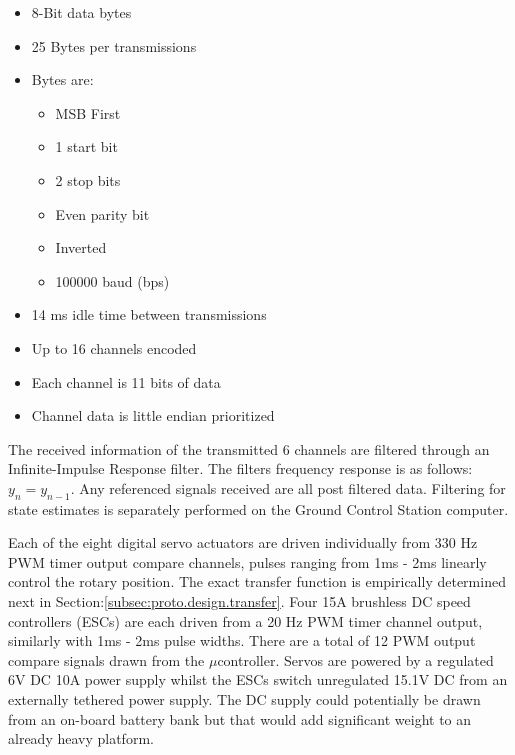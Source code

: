 \begin{itemize}
\item 8-Bit data bytes
\item 25 Bytes per transmissions
\item Bytes are:
\begin{itemize}
\item MSB First
\item 1 start bit
\item 2 stop bits
\item Even parity bit
\item Inverted
\item 100000 baud (bps)
\end{itemize}
\item 14 ms idle time between transmissions
\item Up to 16 channels encoded
\item Each channel is 11 bits of data
\item Channel data is little endian prioritized
\end{itemize}
{\color{red}
The received information of the transmitted 6 channels are filtered through an Infinite-Impulse Response filter. The filters frequency response is as follows: $
y_n = y_{n-1}$. Any referenced signals received are all post filtered data. Filtering for state estimates is separately performed on the Ground Control Station computer.}
\par
Each of the eight digital servo actuators are driven individually from 330 Hz PWM timer output compare channels, pulses ranging from 1ms - 2ms linearly control the rotary position. The exact transfer function is empirically determined next in Section:\ref{subsec:proto.design.transfer}. Four 15A brushless DC speed controllers (ESCs) are each driven from a 20 Hz PWM timer channel output, similarly with 1ms - 2ms pulse widths. There are a total of 12 PWM output compare signals drawn from the $\mu$controller. Servos are powered by a regulated 6V DC 10A power supply \cite{rotorstar} whilst the ESCs switch unregulated 15.1V DC from an externally tethered power supply. The DC supply could potentially be drawn from an on-board battery bank but that would add significant weight to an already heavy platform.
\par
